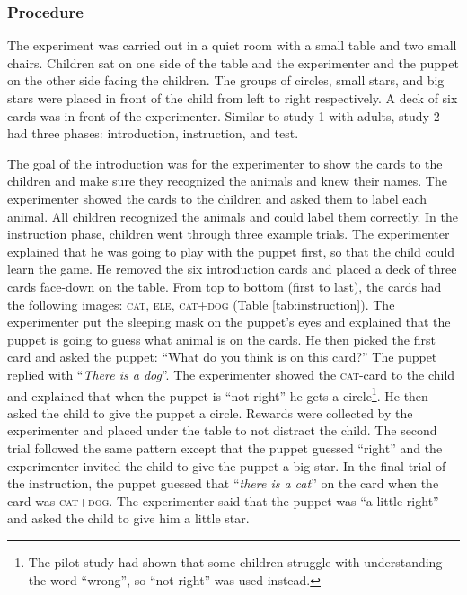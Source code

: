 \documentclass[,man,floatsintext]{apa6}
\let\rmarkdownfootnote\footnote%
\def\footnote{\protect\rmarkdownfootnote}
\begin{document}
\hypertarget{procedure-1}{%
\subsubsection{Procedure}\label{procedure-1}}

The experiment was carried out in a quiet room with a small table and two small chairs. Children sat on one side of the table and the experimenter and the puppet on the other side facing the children. The groups of circles, small stars, and big stars were placed in front of the child from left to right respectively. A deck of six cards was in front of the experimenter. Similar to study 1 with adults, study 2 had three phases: introduction, instruction, and test.

The goal of the introduction was for the experimenter to show the cards to the children and make sure they recognized the animals and knew their names. The experimenter showed the cards to the children and asked them to label each animal. All children recognized the animals and could label them correctly. In the instruction phase, children went through three example trials. The experimenter explained that he was going to play with the puppet first, so that the child could learn the game. He removed the six introduction cards and placed a deck of three cards face-down on the table. From top to bottom (first to last), the cards had the following images: \textsc{cat}, \textsc{ele}, \textsc{cat+dog} (Table \ref{tab:instruction}). The experimenter put the sleeping mask on the puppet's eyes and explained that the puppet is going to guess what animal is on the cards. He then picked the first card and asked the puppet: \enquote{What do you think is on this card?} The puppet replied with \enquote{\emph{There is a dog}}. The experimenter showed the \textsc{cat}-card to the child and explained that when the puppet is \enquote{not right} he gets a circle\footnote{The pilot study had shown that some children struggle with understanding the word \enquote{wrong}, so \enquote{not right} was used instead.}. He then asked the child to give the puppet a circle. Rewards were collected by the experimenter and placed under the table to not distract the child. The second trial followed the same pattern except that the puppet guessed \enquote{right} and the experimenter invited the child to give the puppet a big star. In the final trial of the instruction, the puppet guessed that \enquote{\emph{there is a cat}} on the card when the card was \textsc{cat+dog}. The experimenter said that the puppet was \enquote{a little right} and asked the child to give him a little star.
\end{document}

